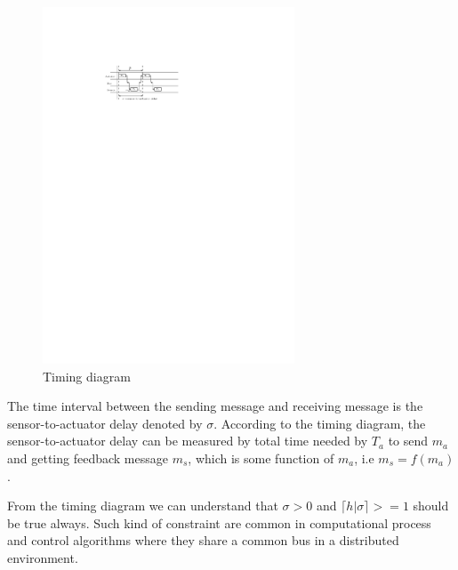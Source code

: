 \begin{figure}
\begin{center}
\includegraphics[width=75mm]{timing_diagram_deadline_cosntraint.pdf}
\end{center}
\caption{Timing diagram}
\label{tim_dig}
\end{figure}


The time interval between the sending message and receiving message is the
sensor-to-actuator delay denoted by $\sigma$. According to the timing diagram,
the sensor-to-actuator delay can be measured by total time needed by $T_a$
to send $m_a$ and getting feedback message $m_s$, which is some function of $m_a$,
i.e $m_s = f(m_a)$. 

From the timing diagram we can understand that $\sigma > 0$ and $\lceil{h|\sigma}\rceil >= 1$
should be true always. Such kind of constraint are common in computational process and 
control algorithms where they share a common bus in a distributed environment.


